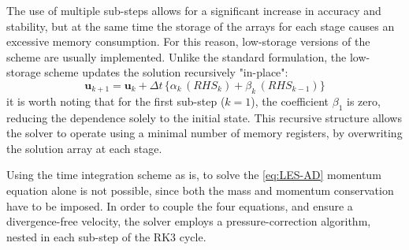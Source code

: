 \documentclass[12pt, a4paper, twoside, openright]{book}
\begin{document}
The use of multiple sub-steps allows for a significant increase in accuracy and stability, but at the same time the storage of the arrays for each stage causes an excessive memory consumption. For this reason, low-storage versions of the scheme are usually implemented. Unlike the standard formulation, the low-storage scheme updates the solution recursively "in-place":
\begin{equation}
\label{eq:RK3-low-storage}
    \bm{u}_{k+1} = \bm{u}_{k} + \Delta t \, \{ \alpha_k \, \left( RHS_{k} \right) + \beta_k \, \left( RHS_{k-1} \right) \}
\end{equation}
it is worth noting that for the first sub-step ($k=1$), the coefficient $\beta_1$ is zero, reducing the dependence solely to the initial state. This recursive structure allows the solver to operate using a minimal number of memory registers, by overwriting the solution array at each stage.

Using the time integration scheme as is, to solve the \eqref{eq:LES-AD} momentum equation alone is not possible, since both the mass and momentum conservation have to be imposed. In order to couple the four equations, and ensure a divergence-free velocity, the solver employs a pressure-correction algorithm, nested in each sub-step of the RK3 cycle.
\end{document}
